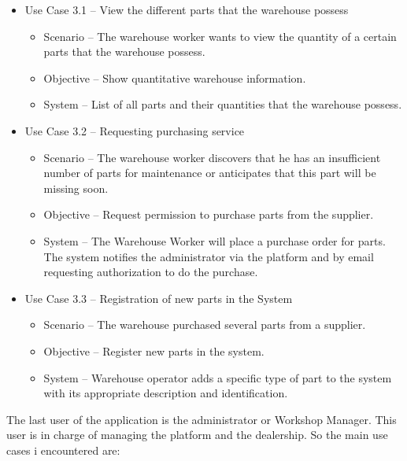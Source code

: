 \begin{itemize}
  \item Use Case 3.1 – View the different parts that the warehouse possess
  \begin{itemize}
    \item Scenario – The warehouse worker wants to view the quantity of a certain parts that the warehouse possess.
    \item Objective – Show quantitative warehouse information.
    \item System – List of all parts and their quantities that the warehouse possess. 
  \end{itemize}
  \item Use Case 3.2 – Requesting purchasing service 
  \begin{itemize}
    \item Scenario – The warehouse worker discovers that he has an insufficient number of parts for maintenance or anticipates that this part will be missing soon.
    \item Objective – Request permission to purchase parts from the supplier.
    \item System – The Warehouse Worker will place a purchase order for parts. The system notifies the administrator via the platform and by email requesting authorization to do the purchase. 
  \end{itemize}
  \item Use Case 3.3 – Registration of new parts in the System
  \begin{itemize}
    \item Scenario – The warehouse purchased several parts from a supplier.
    \item Objective – Register new parts in the system.
    \item System – Warehouse operator adds a specific type of part to the system with its appropriate description and identification.
  \end{itemize}
\end{itemize}
\hfill \break

The last user of the application is the administrator or Workshop Manager. This user is in charge of managing the platform and the dealership. So the main use cases i encountered are:

